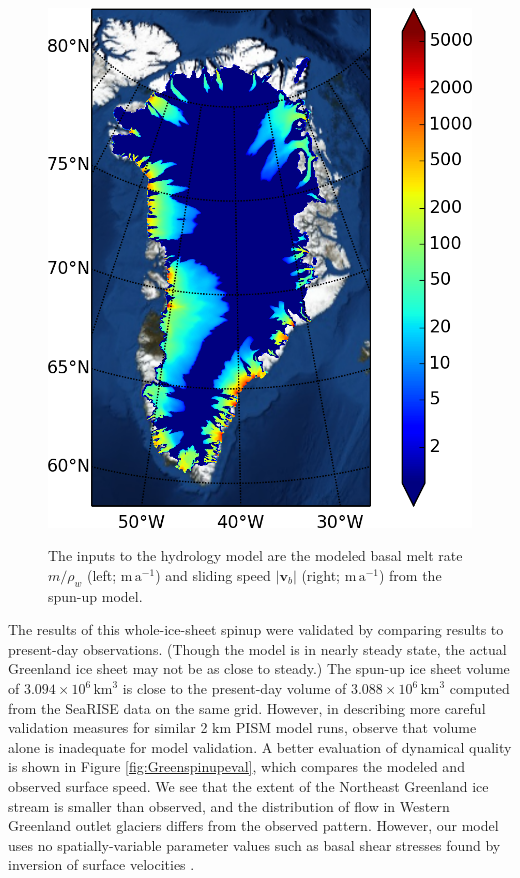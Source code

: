 \documentclass[gmd]{copernicus}   %
\newcommand\bv{\mathbf{v}}
\begin{document}
\begin{figure}[ht]
{\includegraphics[height=\grnht,keepaspectratio=true]{g2km-init-velbase-mag}}
\caption{The inputs to the hydrology model are the modeled basal melt rate $m/\rho_w$ (left; $\mathrm{m}\,\mathrm{a}^{-1}$) and sliding speed $|\bv_b|$ (right; $\mathrm{m}\,\mathrm{a}^{-1}$) from the spun-up model.}
\label{fig:Greenhydroinputs}
\end{figure}
 
The results of this whole-ice-sheet spinup were validated by comparing results to present-day observations.  (Though the model is in nearly steady state, the actual Greenland ice sheet may not be as close to steady.)  The spun-up ice sheet volume of $3.094\times 10^{6}\,\textrm{km}^3$ is close to the present-day volume of $3.088\times 10^{6}\,\textrm{km}^3$ computed from the SeaRISE data on the same grid.  However, in describing more careful validation measures for similar 2 km PISM model runs, \cite{AschwandenAdalgeirsdottirKhroulev} observe that volume alone is inadequate for model validation.  A better evaluation of dynamical quality is shown in Figure \ref{fig:Greenspinupeval}, which compares the modeled and observed surface speed.  We see that the extent of the Northeast Greenland ice stream is smaller than observed, and the distribution of flow in Western Greenland outlet glaciers differs from the observed pattern.  However, our model uses no spatially-variable parameter values such as basal shear stresses found by inversion of surface velocities \citep{AschwandenAdalgeirsdottirKhroulev}.
\end{document}
